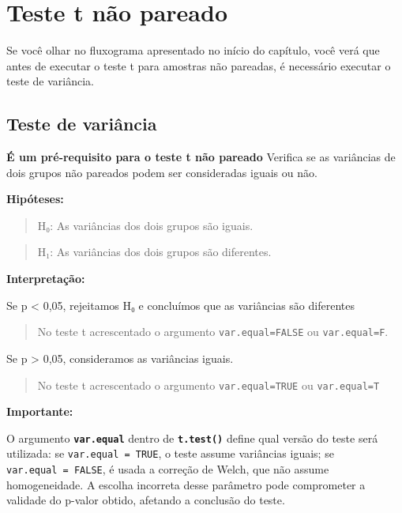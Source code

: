 \documentclass[
]{book}
\begin{document}
\section{Teste t não pareado}\label{teste-t-nuxe3o-pareado}

Se você olhar no fluxograma apresentado no início do capítulo, você verá que antes de executar o teste t para amostras não pareadas, é necessário executar o teste de variância.

\subsection{Teste de variância}\label{teste-de-variuxe2ncia}

\textbf{É um pré-requisito para o teste t não pareado} Verifica se as variâncias de dois grupos não pareados podem ser consideradas iguais ou não.

\textbf{Hipóteses:}

\begin{quote}
H₀: As variâncias dos dois grupos são iguais.
\end{quote}

\begin{quote}
H₁: As variâncias dos dois grupos são diferentes.
\end{quote}

\textbf{Interpretação:}

Se p \textless{} 0,05, rejeitamos H₀ e concluímos que as variâncias são diferentes

\begin{quote}
No teste t acrescentado o argumento \texttt{var.equal=FALSE} ou \texttt{var.equal=F}.
\end{quote}

Se p \textgreater{} 0,05, consideramos as variâncias iguais.

\begin{quote}
No teste t acrescentado o argumento \texttt{var.equal=TRUE} ou \texttt{var.equal=T}
\end{quote}

\textbf{Importante:}

O argumento \textbf{\texttt{var.equal}} dentro de \textbf{\texttt{t.test()}} define qual versão do teste será utilizada: se \texttt{var.equal\ =\ TRUE}, o teste assume variâncias iguais; se \texttt{var.equal\ =\ FALSE}, é usada a correção de Welch, que não assume homogeneidade. A escolha incorreta desse parâmetro pode comprometer a validade do p-valor obtido, afetando a conclusão do teste.
\end{document}
